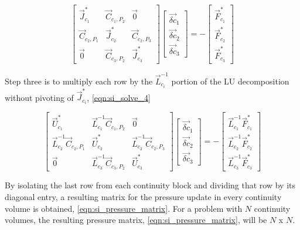   \begin{equation}
 \label{eqn:si_solve_3}
 \begin{bmatrix} 
 \vec{J}^{*}_{c_1} & \vec{C}_{c_1,P_2} & \vec{0} \\
 \vec{C}_{c_2,P_1} & \vec{J}^{*}_{c_2} & \vec{C}_{c_2,P_3} \\
 \vec{0}           & \vec{C}_{c_3,P_2} & \vec{J}^{*}_{c_3}
 \end{bmatrix} \begin{bmatrix}
 \vec{\delta c}_{1} \\
 \vec{\delta c}_{2} \\
 \vec{\delta c}_{3}
\end{bmatrix}  = -\begin{bmatrix}
 \vec{F}^{*}_{c_1} \\
 \vec{F}^{*}_{c_2} \\
 \vec{F}^{*}_{c_3}
\end{bmatrix}
 \end{equation}

Step three is to multiply each row by the $\vec{L}^{-1}_{c_i}$ portion of the LU decomposition without pivoting of $\vec{J}^{*}_{c_i}$, \eqref{eqn:si_solve_4}

  \begin{equation}
 \label{eqn:si_solve_4}
 \begin{bmatrix} 
 \vec{U}^{*}_{c_1} & \vec{L}^{-1}_{c_1}\vec{C}_{c_1,P_2} & \vec{0} \\
 \vec{L}^{-1}_{c_2}\vec{C}_{c_2,P_1} & \vec{U}^{*}_{c_2} & \vec{L}^{-1}_{c_2}\vec{C}_{c_2,P_3} \\
 \vec{0}           & \vec{L}^{-1}_{c_3}\vec{C}_{c_3,P_2} & \vec{U}^{*}_{c_3}
 \end{bmatrix} \begin{bmatrix}
 \vec{\delta c}_{1} \\
 \vec{\delta c}_{2} \\
 \vec{\delta c}_{3}
\end{bmatrix}  = -\begin{bmatrix}
 \vec{L}^{-1}_{c_1}\vec{F}^{*}_{c_1} \\
 \vec{L}^{-1}_{c_2}\vec{F}^{*}_{c_2} \\
 \vec{L}^{-1}_{c_3}\vec{F}^{*}_{c_3}
\end{bmatrix}
 \end{equation}
 
By isolating the last row from each continuity block and dividing that row by its diagonal entry, a resulting matrix for the pressure update in every continuity volume is obtained, \eqref{eqn:si_pressure_matrix}. 
For a problem with $N$ continuity volumes, the resulting pressure matrix, \eqref{eqn:si_pressure_matrix}, will be $N$ x $N$.

